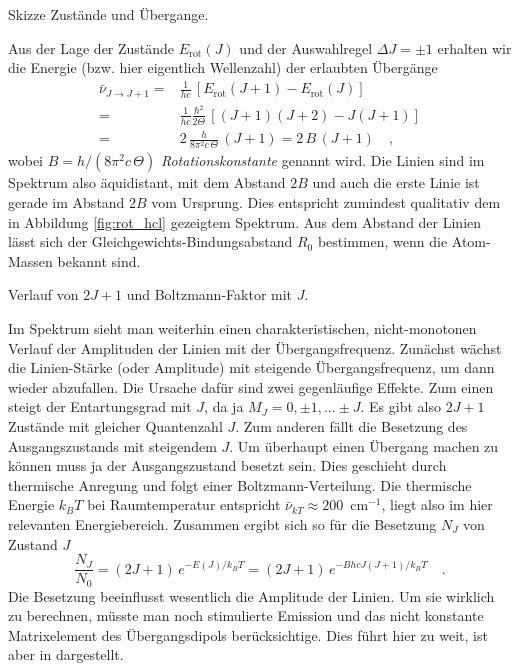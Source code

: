 \begin{marginfigure}
\caption{Skizze Zustände und Übergange.}
\end{marginfigure}


Aus der Lage der Zustände $E_\text{rot}(J)$ und der Auswahlregel $\Delta J = \pm 1$ erhalten wir die  Energie (bzw. hier eigentlich Wellenzahl) der erlaubten Übergänge
\begin{align}
 \bar{\nu}_{J \rightarrow J + 1} =& \frac{1}{h c}  \, \left[ E_\text{rot}(J+1) - E_\text{rot}(J) \right]
 \\ 
 =  & \frac{1}{h c}\frac{\hbar^2}{2 \Theta} \, \left[ (J+1)(J+2) - J (J+1) \right] \\
 = & 2 \, \frac{h}{8 \pi^2 c \, \Theta} \, \left( J +1 \right) = 2 \, B \, (J+1) \quad ,
\end{align}
wobei $B = h / (8 \pi^2 c \, \Theta)$ \emph{Rotationskonstante} genannt wird. Die Linien sind im Spektrum also äquidistant, mit dem Abstand $2B$ und auch die erste Linie ist gerade im Abstand $2B$ vom Ursprung. Dies entspricht zumindest qualitativ dem in Abbildung \ref{fig:rot_hcl} gezeigtem Spektrum. Aus dem Abstand der Linien lässt sich der Gleichgewichts-Bindungsabstand $R_0$ bestimmen, wenn die Atom-Massen bekannt sind.



\begin{marginfigure}
\caption{Verlauf von $2J +1$ und Boltzmann-Faktor mit $J$.}
\end{marginfigure}


Im Spektrum sieht man weiterhin einen charakteristischen, nicht-monotonen Verlauf der Amplituden der Linien mit der Übergangsfrequenz. Zunächst wächst die Linien-Stärke (oder Amplitude) mit steigende Übergangsfrequenz, um dann wieder abzufallen. Die Ursache dafür sind zwei gegenläufige Effekte. Zum einen steigt der Entartungsgrad mit $J$, da ja $M_J = 0, \pm 1, ... \pm J$. Es gibt also $2J+1$ Zustände mit gleicher Quantenzahl $J$.
Zum anderen fällt die Besetzung des Ausgangszustands mit steigendem $J$. Um überhaupt einen Übergang machen zu können muss ja der Ausgangszustand besetzt sein. Dies geschieht durch thermische Anregung und folgt einer Boltzmann-Verteilung. Die thermische Energie $k_B T$ bei Raumtemperatur entspricht  $\bar{\nu}_{k T} \approx 200$~cm$^{-1}$, liegt also im hier relevanten Energiebereich. Zusammen ergibt sich so für die Besetzung $N_J$ von Zustand $J$
\begin{equation}
 \frac{N_J}{N_0}= (2J+1) \, e^{- E(J) / k_B T} = (2J+1) \, e^{- B hc J (J+1) / k_B T}  \quad .
\end{equation}
Die Besetzung beeinflusst wesentlich die Amplitude der Linien. Um sie wirklich zu berechnen, müsste man noch stimulierte Emission und das nicht konstante Matrixelement des Übergangsdipols berücksichtige. Dies führt hier zu weit, ist aber in \cite{Demtröder_molekuelphysik} dargestellt.






